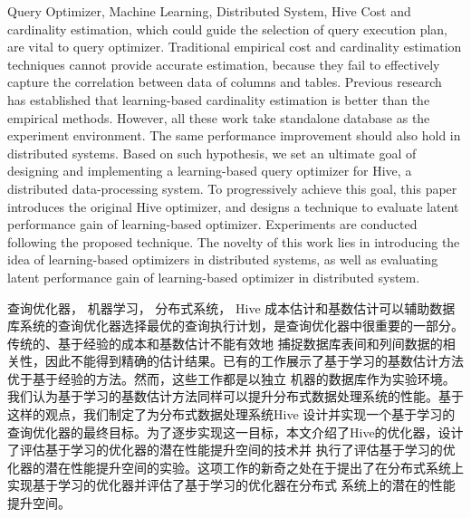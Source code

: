 \begin{英文摘要}{Query Optimizer, Machine Learning, Distributed System, Hive}
    Cost and cardinality estimation, which could guide the selection of query execution plan, are vital to query optimizer. Traditional
    empirical cost and cardinality estimation techniques cannot provide accurate estimation, because they fail to effectively 
    capture the correlation between data of columns and tables. Previous research has established that learning-based cardinality 
    estimation is better than the empirical methods. However, all these work take standalone database as the experiment environment.
    The same performance improvement should also hold in distributed systems. Based on such hypothesis, we set an ultimate goal of designing 
    and implementing a learning-based query optimizer for Hive, a distributed data-processing system. To progressively achieve this goal, this paper 
    introduces the original Hive optimizer, and designs a technique to evaluate latent performance gain of learning-based optimizer. Experiments are 
    conducted following the proposed technique. The novelty of this work lies in introducing the idea of learning-based optimizers in distributed systems, 
    as well as evaluating latent performance gain of learning-based optimizer in distributed system. 
\end{英文摘要}

\begin{中文摘要}{查询优化器， 机器学习， 分布式系统， Hive} 
    成本估计和基数估计可以辅助数据库系统的查询优化器选择最优的查询执行计划，是查询优化器中很重要的一部分。传统的、基于经验的成本和基数估计不能有效地
    捕捉数据库表间和列间数据的相关性，因此不能得到精确的估计结果。已有的工作展示了基于学习的基数估计方法优于基于经验的方法。然而，这些工作都是以独立
    机器的数据库作为实验环境。我们认为基于学习的基数估计方法同样可以提升分布式数据处理系统的性能。基于这样的观点，我们制定了为分布式数据处理系统Hive
    设计并实现一个基于学习的查询优化器的最终目标。为了逐步实现这一目标，本文介绍了Hive的优化器，设计了评估基于学习的优化器的潜在性能提升空间的技术并
    执行了评估基于学习的优化器的潜在性能提升空间的实验。这项工作的新奇之处在于提出了在分布式系统上实现基于学习的优化器并评估了基于学习的优化器在分布式
    系统上的潜在的性能提升空间。
\end{中文摘要}


